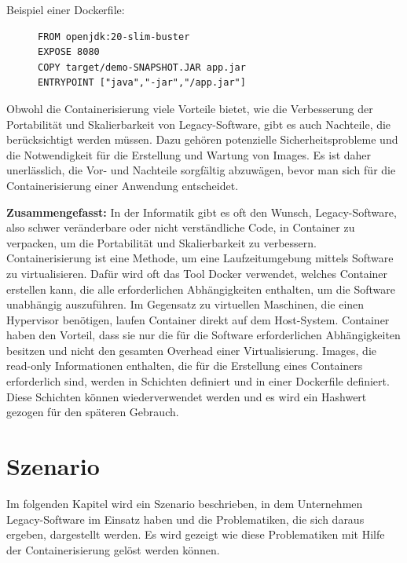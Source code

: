 \begin{description}
	\item[Beispiel einer Dockerfile:]\leavevmode
	\begin{lstlisting}
FROM openjdk:20-slim-buster
EXPOSE 8080
COPY target/demo-SNAPSHOT.JAR app.jar
ENTRYPOINT ["java","-jar","/app.jar"]
\end{lstlisting}
\end{description}


Obwohl die Containerisierung viele Vorteile bietet, wie die Verbesserung der Portabilität und Skalierbarkeit von Legacy-Software, gibt es auch Nachteile, die berücksichtigt werden müssen. Dazu gehören potenzielle Sicherheitsprobleme und die Notwendigkeit für die Erstellung und Wartung von Images. Es ist daher unerlässlich, die Vor- und Nachteile sorgfältig abzuwägen, bevor man sich für die Containerisierung einer Anwendung entscheidet.


\textbf{Zusammengefasst:}
In der Informatik gibt es oft den Wunsch, Legacy-Software, also schwer veränderbare oder nicht verständliche Code, in Container zu verpacken, um die Portabilität und Skalierbarkeit zu verbessern.
Containerisierung ist eine Methode, um eine Laufzeitumgebung mittels Software zu virtualisieren. Dafür wird oft das Tool Docker verwendet, welches Container erstellen kann, die alle erforderlichen Abhängigkeiten enthalten, um die Software unabhängig auszuführen.
Im Gegensatz zu virtuellen Maschinen, die einen Hypervisor benötigen, laufen Container direkt auf dem Host-System. Container haben den Vorteil, dass sie nur die für die Software erforderlichen Abhängigkeiten besitzen und nicht den gesamten Overhead einer Virtualisierung. Images, die read-only Informationen enthalten, die für die Erstellung eines Containers erforderlich sind, werden in Schichten definiert und in einer Dockerfile definiert.
Diese Schichten können wiederverwendet werden und es wird ein Hashwert gezogen für den späteren Gebrauch.


\section{Szenario}
Im folgenden Kapitel wird ein Szenario beschrieben, in dem Unternehmen Legacy-Software im Einsatz haben und die Problematiken, die sich daraus ergeben, dargestellt werden. Es wird gezeigt wie diese Problematiken mit Hilfe der Containerisierung gelöst werden können.

